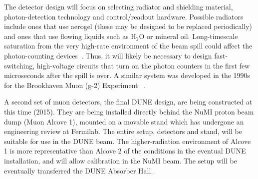 The detector design will focus on selecting radiator and shielding
material, photon-detection technology and control/readout
hardware. Possible radiators include ones that use aerogel (these may be designed to
be replaced periodically) and ones that use flowing liquids such as H$_2$O or
mineral oil. Long-timescale saturation from the very high-rate
environment of the beam spill could affect the photon-counting
devices~\cite{ref:HighRateCounting}. Thus, it will likely be necessary
to design fast-switching, high-voltage circuits that turn on the
photon counters in the first few microseconds after the spill is
over. A similar system was developed in the 1990s for the Brookhaven
Muon (g-2) Experiment~\cite{ref:G2} .

A second set of muon detectors, the final  DUNE design, are being
constructed at this time (2015). They are being installed directly
behind the NuMI proton beam dump (Muon Alcove 1), mounted on a movable stand which has undergone an engineering
review at Fermilab. 
%
The entire setup, detectors and stand, will be
suitable for use in the DUNE beam. The higher-radiation environment of Alcove 1 is more representative %
than Alcove 2 of the conditions in the eventual DUNE installation, and will allow  calibration in the NuMI beam. The setup will be eventually transferred the DUNE Absorber Hall. 


